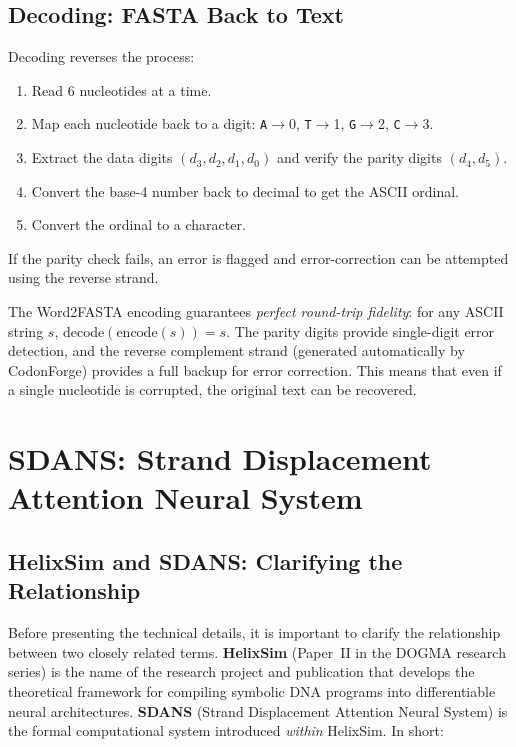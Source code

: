 \subsection{Decoding: FASTA Back to Text}

Decoding reverses the process:
\begin{enumerate}[leftmargin=1.8em]
  \item Read 6 nucleotides at a time.
  \item Map each nucleotide back to a digit: \texttt{A}$\to$0, \texttt{T}$\to$1, \texttt{G}$\to$2, \texttt{C}$\to$3.
  \item Extract the data digits $(d_3, d_2, d_1, d_0)$ and verify the parity digits $(d_4, d_5)$.
  \item Convert the base-4 number back to decimal to get the ASCII ordinal.
  \item Convert the ordinal to a character.
\end{enumerate}

If the parity check fails, an error is flagged and error-correction can be attempted using the reverse strand.

\begin{implnote}
The Word2FASTA encoding guarantees \emph{perfect round-trip fidelity}: for any ASCII string $s$, $\text{decode}(\text{encode}(s)) = s$. The parity digits provide single-digit error detection, and the reverse complement strand (generated automatically by CodonForge) provides a full backup for error correction. This means that even if a single nucleotide is corrupted, the original text can be recovered.
\end{implnote}


\section{SDANS: Strand Displacement Attention Neural System}
\label{sec:sdans}

\subsection{HelixSim and SDANS: Clarifying the Relationship}
\label{subsec:helixsim-sdans}

Before presenting the technical details, it is important to clarify the relationship between two closely related terms. \textbf{HelixSim} (Paper~II in the DOGMA research series) is the name of the research project and publication that develops the theoretical framework for compiling symbolic DNA programs into differentiable neural architectures. \textbf{SDANS} (Strand Displacement Attention Neural System) is the formal computational system introduced \emph{within} HelixSim. In short:

